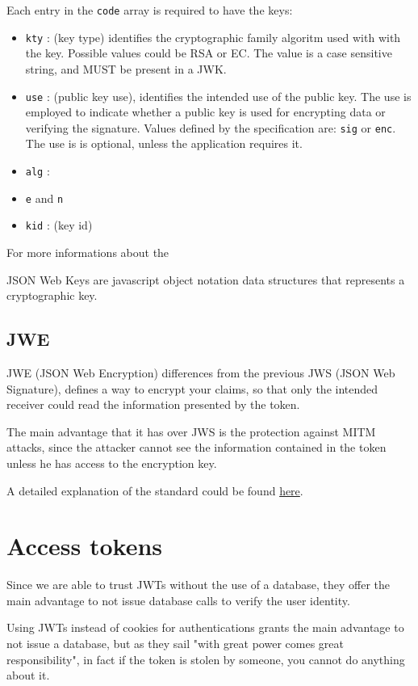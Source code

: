 \documentclass[11pt]{style}
\begin{document}
Each entry in the \texttt{code} array is required to have the keys:
\begin{itemize}
    \item \texttt{kty} : (key type) identifies the cryptographic family algoritm
        used with with the key. Possible values could be RSA or EC.
        The value is a case sensitive string, and MUST be present in a JWK.
    \item \texttt{use} : (public key use), identifies the intended use of the
        public key. The use is employed to indicate whether a public key is used
        for encrypting data or verifying the signature. Values defined by the
        specification are: \texttt{sig} or \texttt{enc}.
        The use is is optional, unless the application requires it.
    \item \texttt{alg} :
    \item \texttt{e} and \texttt{n}
    \item \texttt{kid} : (key id)
\end{itemize}

For more informations about the

JSON Web Keys are javascript object notation data structures that represents a
cryptographic key.

\subsection{JWE}
JWE (JSON Web Encryption) differences from the previous JWS (JSON Web
Signature), defines a way to encrypt your claims, so that only the intended
receiver could read the information presented by the token.

The main advantage that it has over JWS is the protection against MITM attacks,
since the attacker cannot see the information contained in the token unless he
has access to the encryption key.

A detailed explanation of the standard could be found
\href{https://tools.ietf.org/html/draft-ietf-jose-json-web-signature-41}{here}.


\section{Access tokens}
Since we are able to trust JWTs  without the use of a database, they offer the
main advantage to not issue database calls to verify the user identity.


Using JWTs instead of cookies for authentications grants the main advantage to
not issue a database, but as they sail "with great power comes great
responsibility", in fact if the token is stolen by someone, you cannot do
anything about it.
\end{document}
